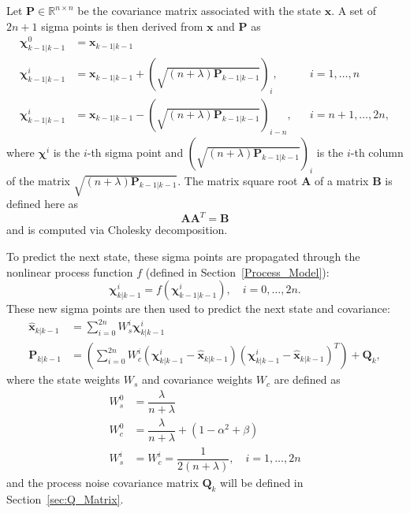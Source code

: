 Let $\mathbf{P} \in \mathbb{R}^{n \times n}$ be the covariance matrix associated with the state $\mathbf{x}$. A set of $2n + 1$ sigma points is then derived from $\mathbf{x}$ and $\mathbf{P}$ as
%
\begin{align}
\bm{\chi}^{0}_{k-1 | k-1} &= \mathbf{x}_{k-1 | k-1} \nonumber\\
\bm{\chi}^{i}_{k-1 | k-1} &= \mathbf{x}_{k-1 | k-1} + \left( \sqrt{\left( n + \lambda \right) \mathbf{P}_{k-1 | k-1}} \right)_{i}, &&i = 1, \dots, n \\
\bm{\chi}^{i}_{k-1 | k-1} &= \mathbf{x}_{k-1 | k-1} - \left( \sqrt{\left( n + \lambda \right) \mathbf{P}_{k-1 | k-1}} \right)_{i-n}, &&i = n+1, \dots, 2n, \nonumber
\end{align}
%
where $\bm{\chi}^{i}$ is the $i$-th sigma point and $\left( \sqrt{\left( n + \lambda \right) \mathbf{P}_{k-1 | k-1}} \right)_{i}$ is the $i$-th column of the matrix $\sqrt{\left( n + \lambda \right) \mathbf{P}_{k-1 | k-1}}$. The matrix square root $\mathbf{A}$ of a matrix $\mathbf{B}$ is defined here as
%
\begin{equation}
\mathbf{A} \mathbf{A}^{T} = \mathbf{B}
\end{equation}
%
and is computed via Cholesky decomposition.

To predict the next state, these sigma points are propagated through the nonlinear process function $f$ (defined in Section~\ref{Process_Model}):
%
\begin{equation}
\bm{\chi}^{i}_{k | k-1} = f \left( \bm{\chi}^{i}_{k-1 | k-1} \right), \quad i = 0, \dots, 2n.
\end{equation}
%
These new sigma points are then used to predict the next state and covariance:
%
\begin{align}
\hat{\mathbf{x}}_{k | k-1} &= \sum^{2n}_{i=0} W^{i}_{s} \bm{\chi}^{i}_{k | k-1} \\
\mathbf{P}_{k | k-1} &= \left( \sum^{2n}_{i=0} W^{i}_{c} \left( \bm{\chi}^{i}_{k | k-1} - \hat{\mathbf{x}}_{k | k-1} \right) \left( \bm{\chi}^{i}_{k | k-1} - \hat{\mathbf{x}}_{k | k-1} \right)^{T} \right) + \mathbf{Q}_{k},
\end{align}
%
where the state weights $W_{s}$ and covariance weights $W_{c}$ are defined as
%
\begin{align}
W^{0}_{s} &= \dfrac{\lambda}{n + \lambda} \nonumber \\
W^{0}_{c} &= \dfrac{\lambda}{n + \lambda} + \left( 1 - \alpha^{2} + \beta \right) \\
W^{i}_{s} &= W^{i}_{c} = \dfrac{1}{2 \left(n + \lambda \right)}, \quad i = 1, \dots, 2n \nonumber
\end{align}
%
and the process noise covariance matrix $\mathbf{Q}_{k}$ will be defined in Section~\ref{sec:Q_Matrix}.


